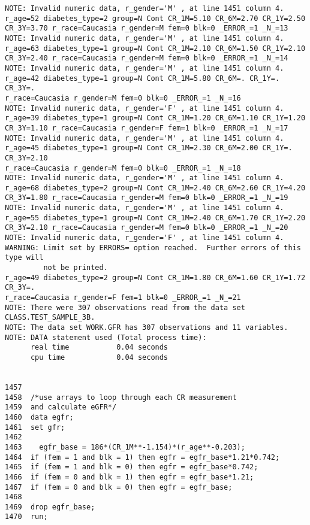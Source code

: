 \documentclass{article}\usepackage[]{graphicx}\usepackage[]{color}
\begin{document}
\begin{verbatim}
NOTE: Invalid numeric data, r_gender='M' , at line 1451 column 4.
r_age=52 diabetes_type=2 group=N Cont CR_1M=5.10 CR_6M=2.70 CR_1Y=2.50
CR_3Y=3.70 r_race=Caucasia r_gender=M fem=0 blk=0 _ERROR_=1 _N_=13
NOTE: Invalid numeric data, r_gender='M' , at line 1451 column 4.
r_age=63 diabetes_type=1 group=N Cont CR_1M=2.10 CR_6M=1.50 CR_1Y=2.10
CR_3Y=2.40 r_race=Caucasia r_gender=M fem=0 blk=0 _ERROR_=1 _N_=14
NOTE: Invalid numeric data, r_gender='M' , at line 1451 column 4.
r_age=42 diabetes_type=1 group=N Cont CR_1M=5.80 CR_6M=. CR_1Y=. CR_3Y=.
r_race=Caucasia r_gender=M fem=0 blk=0 _ERROR_=1 _N_=16
NOTE: Invalid numeric data, r_gender='F' , at line 1451 column 4.
r_age=39 diabetes_type=1 group=N Cont CR_1M=1.20 CR_6M=1.10 CR_1Y=1.20
CR_3Y=1.10 r_race=Caucasia r_gender=F fem=1 blk=0 _ERROR_=1 _N_=17
NOTE: Invalid numeric data, r_gender='M' , at line 1451 column 4.
r_age=45 diabetes_type=1 group=N Cont CR_1M=2.30 CR_6M=2.00 CR_1Y=. CR_3Y=2.10
r_race=Caucasia r_gender=M fem=0 blk=0 _ERROR_=1 _N_=18
NOTE: Invalid numeric data, r_gender='M' , at line 1451 column 4.
r_age=68 diabetes_type=2 group=N Cont CR_1M=2.40 CR_6M=2.60 CR_1Y=4.20
CR_3Y=1.80 r_race=Caucasia r_gender=M fem=0 blk=0 _ERROR_=1 _N_=19
NOTE: Invalid numeric data, r_gender='M' , at line 1451 column 4.
r_age=55 diabetes_type=1 group=N Cont CR_1M=2.40 CR_6M=1.70 CR_1Y=2.20
CR_3Y=2.10 r_race=Caucasia r_gender=M fem=0 blk=0 _ERROR_=1 _N_=20
NOTE: Invalid numeric data, r_gender='F' , at line 1451 column 4.
WARNING: Limit set by ERRORS= option reached.  Further errors of this type will
         not be printed.
r_age=49 diabetes_type=2 group=N Cont CR_1M=1.80 CR_6M=1.60 CR_1Y=1.72 CR_3Y=.
r_race=Caucasia r_gender=F fem=1 blk=0 _ERROR_=1 _N_=21
NOTE: There were 307 observations read from the data set CLASS.TEST_SAMPLE_3B.
NOTE: The data set WORK.GFR has 307 observations and 11 variables.
NOTE: DATA statement used (Total process time):
      real time           0.04 seconds
      cpu time            0.04 seconds


1457
1458  /*use arrays to loop through each CR measurement
1459  and calculate eGFR*/
1460  data egfr;
1461  set gfr;
1462
1463    egfr_base = 186*(CR_1M**-1.154)*(r_age**-0.203);
1464  if (fem = 1 and blk = 1) then egfr = egfr_base*1.21*0.742;
1465  if (fem = 1 and blk = 0) then egfr = egfr_base*0.742;
1466  if (fem = 0 and blk = 1) then egfr = egfr_base*1.21;
1467  if (fem = 0 and blk = 0) then egfr = egfr_base;
1468
1469  drop egfr_base;
1470  run;


\end{verbatim}
\end{document}
